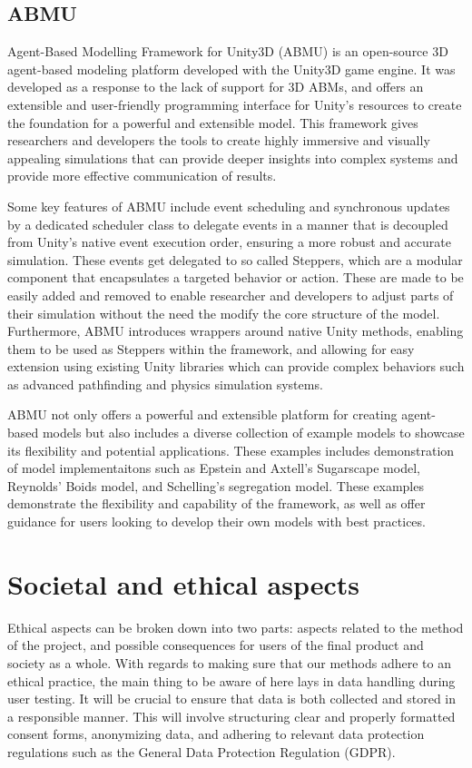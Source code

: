     \subsection{ABMU}
        Agent-Based Modelling Framework for Unity3D (ABMU) is an open-source 3D agent-based modeling platform developed with the Unity3D game engine\cite{unity2021manual}. It was developed as a response to the lack of support for 3D ABMs\cite{abmu-paper}, and offers an extensible and user-friendly programming interface for Unity’s resources to create the foundation for a powerful and extensible model\cite{abmu2021}. This framework gives researchers and developers the tools to create highly immersive and visually appealing simulations that can provide deeper insights into complex systems and provide more effective communication of results.

        Some key features of ABMU include event scheduling and synchronous updates by a dedicated scheduler class to delegate events in a manner that is decoupled from Unity’s native event execution order, ensuring a more robust and accurate simulation. These events get delegated to so called Steppers, which are a modular component that encapsulates a targeted behavior or action. These are made to be easily added and removed to enable researcher and developers to adjust parts of their simulation without the need the modify the core structure of the model. Furthermore, ABMU introduces wrappers around native Unity methods, enabling them to be used as Steppers within the framework, and allowing for easy extension using existing Unity libraries which can provide complex behaviors such as advanced pathfinding and physics simulation systems.

        ABMU not only offers a powerful and extensible platform for creating agent-based models but also includes a diverse collection of example models to showcase its flexibility and potential applications. These examples includes demonstration of model implementaitons such as Epstein and Axtell's Sugarscape model\cite{epstein1996growing}, Reynolds' Boids model\cite{reynolds1987flocks}, and Schelling's segregation model\cite{schelling1971dynamic}. These examples demonstrate the flexibility and capability of the framework, as well as offer guidance for users looking to develop their own models with best practices.

\section{Societal and ethical aspects}
    Ethical aspects can be broken down into two parts: aspects related to the method of the project, and possible consequences for users of the final product and society as a whole.  With regards to making sure that our methods adhere to an ethical practice, the main thing to be aware of here lays in data handling during user testing. It will be crucial to ensure that data is both collected and stored in a responsible manner. This will involve structuring clear and properly formatted consent forms\cite{ico2021consent}, anonymizing data, and adhering to relevant data protection regulations such as the General Data Protection Regulation (GDPR)\cite{gdpr2016}.


